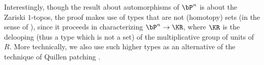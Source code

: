 Interestingly, though the result about automorphisms of $\bP^n$
is about the Zariski $1$-topos, the proof makes use of types that
are not (homotopy) sets (in the sense of \cite{hott}),
since it proceeds in characterizing $\bP^n\rightarrow\KR$, where $\KR$ is the delooping
(thus a type which is not a set) of the multiplicative group of units of $R$.
More technically, we also use such higher types as an alternative of the technique
of Quillen patching \cite{Quillen,lombardi-quitte,lam}.













